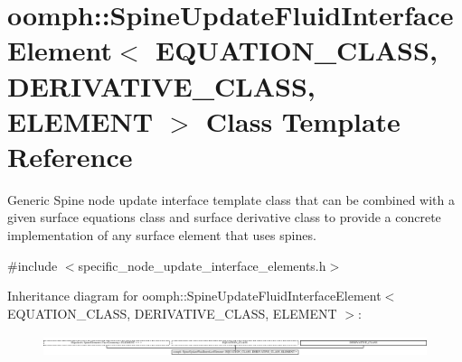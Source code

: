 \hypertarget{classoomph_1_1SpineUpdateFluidInterfaceElement}{}\section{oomph\+:\+:Spine\+Update\+Fluid\+Interface\+Element$<$ E\+Q\+U\+A\+T\+I\+O\+N\+\_\+\+C\+L\+A\+SS, D\+E\+R\+I\+V\+A\+T\+I\+V\+E\+\_\+\+C\+L\+A\+SS, E\+L\+E\+M\+E\+NT $>$ Class Template Reference}
\label{classoomph_1_1SpineUpdateFluidInterfaceElement}


Generic Spine node update interface template class that can be combined with a given surface equations class and surface derivative class to provide a concrete implementation of any surface element that uses spines.  




{\ttfamily \#include $<$specific\+\_\+node\+\_\+update\+\_\+interface\+\_\+elements.\+h$>$}

Inheritance diagram for oomph\+:\+:Spine\+Update\+Fluid\+Interface\+Element$<$ E\+Q\+U\+A\+T\+I\+O\+N\+\_\+\+C\+L\+A\+SS, D\+E\+R\+I\+V\+A\+T\+I\+V\+E\+\_\+\+C\+L\+A\+SS, E\+L\+E\+M\+E\+NT $>$\+:\begin{figure}[H]
\begin{center}
\leavevmode
\includegraphics[height=0.633843cm]{classoomph_1_1SpineUpdateFluidInterfaceElement}
\end{center}
\end{figure}
